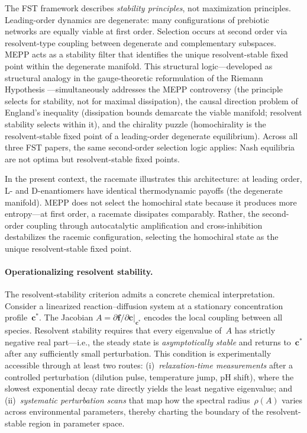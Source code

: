 \documentclass[12pt,a4paper]{article}
\theoremstyle{remark}
\begin{document}
The FST framework describes \emph{stability principles}, not maximization principles. Leading-order dynamics are degenerate: many configurations of prebiotic networks are equally viable at first order. Selection occurs at second order via resolvent-type coupling between degenerate and complementary subspaces. MEPP acts as a stability filter that identifies the unique resolvent-stable fixed point within the degenerate manifold. This structural logic---developed as structural analogy in the gauge-theoretic reformulation of the Riemann Hypothesis \citep{GeigerRH2026b}---simultaneously addresses the MEPP controversy (the principle selects for stability, not for maximal dissipation), the causal direction problem of England's inequality (dissipation bounds demarcate the viable manifold; resolvent stability selects within it), and the chirality puzzle (homochirality is the resolvent-stable fixed point of a leading-order degenerate equilibrium). Across all three FST papers, the same second-order selection logic applies: Nash equilibria are not optima but resolvent-stable fixed points.

In the present context, the racemate illustrates this architecture: at leading order, L- and D-enantiomers have identical thermodynamic payoffs (the degenerate manifold). MEPP does not select the homochiral state because it produces more entropy---at first order, a racemate dissipates comparably. Rather, the second-order coupling through autocatalytic amplification and cross-inhibition destabilizes the racemic configuration, selecting the homochiral state as the unique resolvent-stable fixed point.

\paragraph{Operationalizing resolvent stability.}
The resolvent-stability criterion admits a concrete chemical interpretation.
Consider a linearized reaction--diffusion system at a stationary concentration
profile~$\mathbf{c}^{*}$.  The Jacobian
$A = \partial \mathbf{f}/\partial \mathbf{c}\big|_{\mathbf{c}^{*}}$
encodes the local coupling between all species.  Resolvent stability requires
that every eigenvalue of~$A$ has strictly negative real part---i.e., the
steady state is \emph{asymptotically stable} and returns to~$\mathbf{c}^{*}$
after any sufficiently small perturbation.
This condition is experimentally accessible through at least two routes:
(i)~\emph{relaxation-time measurements} after a controlled perturbation
(dilution pulse, temperature jump, pH shift), where the slowest exponential
decay rate directly yields the least negative eigenvalue; and
(ii)~\emph{systematic perturbation scans} that map how the spectral
radius~$\rho(A)$ varies across environmental parameters, thereby charting the
boundary of the resolvent-stable region in parameter space.
\end{document}
